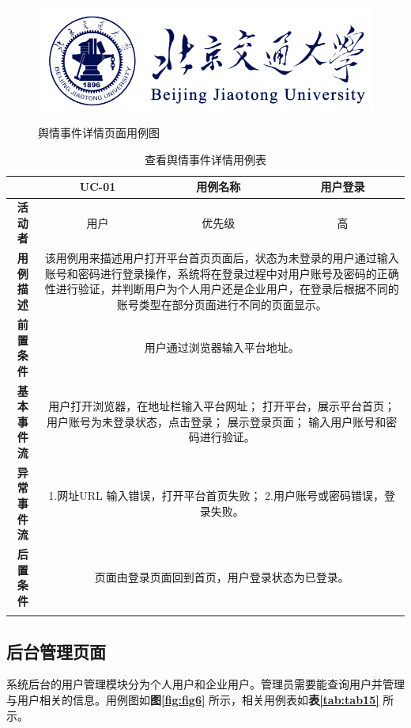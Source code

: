 \begin{figure}[!htb]
	\centering\label{fig:fig5}
	\includegraphics[scale=1]{image/logo1.png}
	\caption{舆情事件详情页面用例图}
\end{figure}

\begin{longtable}[c]{c|ccc}
	\caption{查看舆情事件详情用例表}
	\label{tab:tab14}\\
	\shline
	\multicolumn{1}{c|}{\textbf{用例编号}} & \multicolumn{1}{c|}{UC-01} & \multicolumn{1}{c|}{用例名称} &  用户登录\\ \hline
	\endhead
	\multicolumn{1}{c|}{\textbf{活动者}} & \multicolumn{1}{c|}{用户} & \multicolumn{1}{c|}{优先级} &高  \\ \hline
	\textbf{用例描述} & \multicolumn{3}{p{12cm}}{该用例用来描述用户打开平台首页页面后，状态为未登录的用户通过输入账号和密码进行登录操作，系统将在登录过程中对用户账号及密码的正确性进行验证，并判断用户为个人用户还是企业用户，在登录后根据不同的账号类型在部分页面进行不同的页面显示。} \\ \hline
	\textbf{前置条件}& \multicolumn{3}{p{12cm}}{用户通过浏览器输入平台地址。} \\ \hline
	\textbf{基本事件流}& \multicolumn{3}{p{12cm}}{用户打开浏览器，在地址栏输入平台网址；\newline
		打开平台，展示平台首页；\newline
		用户账号为未登录状态，点击登录；\newline
		展示登录页面；\newline
		输入用户账号和密码进行验证。} \\ \hline
	\textbf{异常事件流}& \multicolumn{3}{p{12cm}}{1.网址URL 输入错误，打开平台首页失败；\newline
		2.用户账号或密码错误，登录失败。
	} \\ \hline
	\textbf{后置条件}& \multicolumn{3}{p{12cm}}{页面由登录页面回到首页，用户登录状态为已登录。} \\ \shline
\end{longtable}

\subsection{后台管理页面}
系统后台的用户管理模块分为个人用户和企业用户。管理员需要能查询用户并管理与用户相关的信息。用例图如\textbf{图\ref{fig:fig6}} 所示，相关用例表如\textbf{表\ref{tab:tab15}} 所示。

